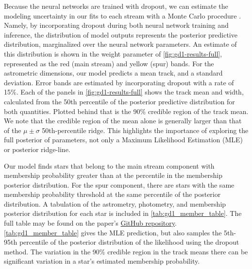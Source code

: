 \documentclass[twocolumn, linenumbers]{aastex631}
\begin{document}
        Because the neural networks are trained with dropout, we can estimate
        the modeling uncertainty in our fits to each stream with a Monte Carlo
        procedure \citep{GalGhahramani2015}. Namely, by incorporating dropout
        during both neural network training and inference, the distribution of
        model outputs represents the posterior predictive distribution,
        marginalized over the neural network parameters. An estimate of this
        distribution is shown in the weight parameter of
        \autoref{fig:gd1-results-full}, represented as the red (main stream) and
        yellow (spur) bands. For the astrometric dimensions, our model predicts
        a mean track, and a standard deviation. Error bands are estimated by
        incorporating dropout with a rate of 15\%. Each of the panels in
        \autoref{fig:gd1-results-full} shows the track mean and width,
        calculated from the 50th percentile of the posterior predictive
        distribution for both quantities. Plotted behind that is the 90\%
        credible region of the track mean. We note that the credible region of
        the mean alone is generally larger than that of the $\mu \pm \sigma$
        50th-percentile ridge. This highlights the importance of exploring the
        full posterior of parameters, not only a Maximum Likelihood Estimation
        (MLE) or posterior ridge-line.
        
        Our model finds stars
        that belong to the main stream component with membership probability
        greater than
         at the
         percentile in the
        membership posterior distribution. For the spur component, there are
         stars with the same
        membership probability threshold at the same percentile of the posterior
        distribution.  A tabulation of the astrometry, photometry, and
        membership posterior distribution for each star is included in
        \autoref{tab:gd1_member_table}. The full table may be found on the
        paper's
        \href{https://github.com/nstarman/stellar_stream_density_ml_paper}{GitHub
        repository}. \autoref{tab:gd1_member_table} gives the MLE prediction,
        but also samples the 5th-95th percentile of the posterior distribution
        of the likelihood using the dropout method. The variation in the 90\%
        credible region in the track means there can be significant variation in
        a star's estimated membership probability. 
\end{document}
